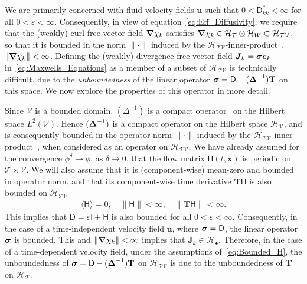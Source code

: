 \documentclass[leqno,onefignum,onetabnum]{siamltex1213}
\newcommand{\Tb}{\mathbf{T}}
\newcommand{\Tc}{\mathcal{T}}
\newcommand{\Vc}{\mathcal{V}}
\newcommand{\Hc}{\mathcal{H}}
\newcommand{\Dm}{\mathsf{D}}
\newcommand{\Hm}{\mathsf{H}}
\newcommand{\Ib}{\mathsf{I}}
\newcommand\bsig{\mbox{\boldmath${\sigma}$}}
\newcommand\bDelta{\mbox{\boldmath${\Delta}$}}
\newcommand\bnabla{\mbox{\boldmath${\nabla}$}}
\newcommand{\vecJ}{\boldsymbol{J}}
\newcommand{\vecx}{\boldsymbol{x}}
\newcommand{\vecu}{\boldsymbol{u}}
\newcommand{\vece}{\boldsymbol{e}}
\begin{document}
We are primarily concerned with fluid velocity fields $\vecu $ such
that $0<\Dm^*_{kk}<\infty$ for all $0<\varepsilon<\infty$. Consequently, in view of
equation~\eqref{eq:Eff_Diffusivity}, we require that the (weakly)
curl-free vector field $\bnabla \chi_k$ satisfies
$\bnabla \chi_k\in\Hc_{\Tc}\otimes\Hc_W\subset\Hc_{\Tc\Vc}$, so that it is
bounded in the norm $\|\cdot\|$ induced by the
$\Hc_{\Tc\Vc}$-inner-product~\cite{Folland:99:RealAnalysis}, $\|\bnabla
\chi_k\|<\infty$. Defining the (weakly) 
divergence-free vector field $\vecJ_k=\bsig\vece _k$
in~\eqref{eq:Maxwells_Equations} as a member of a subset of 
$\Hc_{\Tc\Vc}$ is technically difficult, due to the
\emph{unboundedness} of the linear operator
$\bsig=\Dm-(\bDelta^{-1})\Tb$ on this space. We now explore the
properties of this operator in more detail.  





Since $\Vc$ is a bounded domain, $(\Delta^{-1})$ is a compact
operator~\cite{Stakgold:BVP:2000} on the Hilbert space
$L^2(\Vc)$. Hence 
$(\bDelta^{-1})$ is a compact operator on the Hilbert space
$\Hc_{\Vc}$, and is consequently bounded in the operator norm $\|\cdot\|$
induced by the
$\Hc_{\Tc\Vc}$-inner-product~\cite{Reed-1980,Stone:64,Stakgold:BVP:2000},
when considered as an  
operator on $\Hc_{\Tc\Vc}$.  We have already assumed 
for the convergence $\phi^\delta\to\bar{\phi}$, as $\delta\to0$, that the flow matrix
$\Hm(t,\vecx)$ is periodic on $\Tc\times\Vc$. We will also assume that it
is (component-wise) mean-zero and bounded in operator norm, and that
its component-wise time derivative $\Tb\Hm$ is also bounded on
$\Hc_{\Tc\Vc}$ 
%
\begin{align}\label{eq:Bounded_H}
  \langle\Hm\rangle=0, \quad \|\Hm\|<\infty, \quad \|\Tb\Hm\|<\infty.
\end{align}
%
This implies that $\Dm=\varepsilon\Ib+\Hm$ is also bounded for all
$0<\varepsilon<\infty$. Consequently, in the case of a time-independent velocity 
field $\vecu $, where $\bsig=\Dm$, the linear operator $\bsig$ is
bounded. This and $\|\bnabla \chi_k\|<\infty$ implies that 
$\vecJ_k\in\Hc_\bullet$. Therefore, in the case of a time-dependent velocity
field, under the assumptions of~\eqref{eq:Bounded_H}, the
unboundedness of $\bsig=\Dm-(\bDelta^{-1})\Tb$ on $\Hc_{\Tc\Vc}$
is due to the unboundedness of $\Tb$ on $\Hc_{\Tc}$.   
\end{document}
